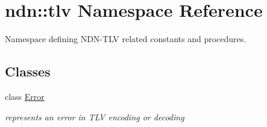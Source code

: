\hypertarget{namespacendn_1_1tlv}{}\section{ndn\+:\+:tlv Namespace Reference}
\label{namespacendn_1_1tlv}


Namespace defining N\+D\+N-\/\+T\+LV related constants and procedures.  


\subsection*{Classes}
\begin{DoxyCompactItemize}
\item 
class \hyperlink{classndn_1_1tlv_1_1Error}{Error}
\begin{DoxyCompactList}\small\item\em represents an error in T\+LV encoding or decoding \end{DoxyCompactList}\end{DoxyCompactItemize}
